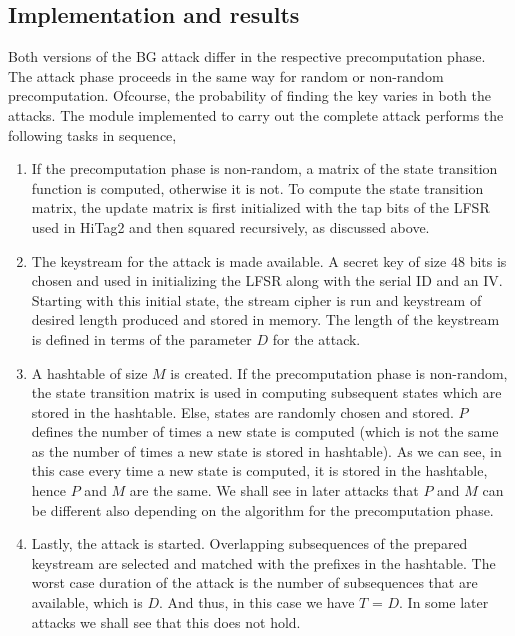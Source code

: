 \subsection{Implementation and results}
\label{sec:keystream-attack-impl}

Both versions of the BG attack differ in the respective precomputation phase. The attack phase proceeds in the same way for random or non-random precomputation. Ofcourse, the probability of finding the key varies in both the attacks. The module implemented to carry out the complete attack performs the following tasks in sequence,
\begin{enumerate}
\item If the precomputation phase is non-random, a matrix of the state transition function is computed, otherwise it is not. To compute the state transition matrix, the update matrix is first initialized with the tap bits of the LFSR used in HiTag2 and then squared recursively, as discussed above.
\item The keystream for the attack is made available. A secret key of size $48$ bits is chosen and used in initializing the LFSR along with the serial ID and an IV. Starting with this initial state, the stream cipher is run and keystream of desired length produced and stored in memory. The length of the keystream is defined in terms of the parameter $D$ for the attack.
\item A hashtable of size $M$ is created. If the precomputation phase is non-random, the state transition matrix is used in computing subsequent states which are stored in the hashtable. Else, states are randomly chosen and stored. $P$ defines the number of times a new state is computed (which is not the same as the number of times a new state is stored in hashtable). As we can see, in this case every time a new state is computed, it is stored in the hashtable, hence $P$ and $M$ are the same. We shall see in later attacks that $P$ and $M$ can be different also depending on the algorithm for the precomputation phase. 
\item Lastly, the attack is started. Overlapping subsequences of the prepared keystream are selected and matched with the prefixes in the hashtable. The worst case duration of the attack is the number of subsequences that are available, which is $D$. And thus, in this case we have $T$ = $D$. In some later attacks we shall see that this does not hold. 
\end{enumerate}


